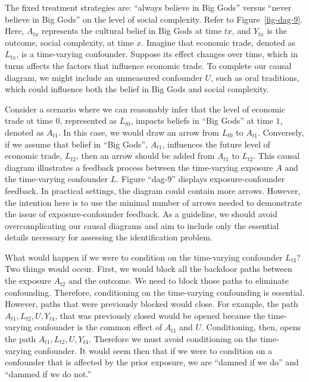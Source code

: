 \documentclass[
  singlecolumn]{article}
\begin{document}
The fixed treatment strategies are: ``always believe in Big Gods''
versus ``never believe in Big Gods'' on the level of social complexity.
Refer to Figure~\ref{fig-dag-9}. Here, \(A_{tx}\) represents the
cultural belief in Big Gods at time \(tx\), and \(Y_{tx}\) is the
outcome, social complexity, at time \(x\). Imagine that economic trade,
denoted as \(L_{tx}\), is a time-varying confounder. Suppose its effect
changes over time, which in turns affects the factors that influence
economic trade. To complete our causal diagram, we might include an
unmeasured confounder \(U\), such as oral traditions, which could
influence both the belief in Big Gods and social complexity.

Consider a scenario where we can reasonably infer that the level of
economic trade at time \(0\), represented as \(L_{t0}\), impacts beliefs
in ``Big Gods'' at time \(1\), denoted as \(A_{t1}\). In this case, we
would draw an arrow from \(L_{t0}\) to \(A_{t1}\). Conversely, if we
assume that belief in ``Big Gods'', \(A_{t1}\), influences the future
level of economic trade, \(L_{t2}\), then an arrow should be added from
\(A_{t1}\) to \(L_{t2}\). This causal diagram illustrates a feedback
process between the time-varying exposure \(A\) and the time-varying
confounder \(L\). Figure ``dag-9'' displays exposure-confounder
feedback. In practical settings, the diagram could contain more arrows.
However, the intention here is to use the minimal number of arrows
needed to demonstrate the issue of exposure-confounder feedback. As a
guideline, we should avoid overcomplicating our causal diagrams and aim
to include only the essential details necessary for assessing the
identification problem.

What would happen if we were to condition on the time-varying confounder
\(L_{t3}\)? Two things would occur. First, we would block all the
backdoor paths between the exposure \(A_{t2}\) and the outcome. We need
to block those paths to eliminate confounding. Therefore, conditioning
on the time-varying confounding is essential. However, paths that were
previously blocked would close. For example, the path
\(A_{t1}, L_{t2}, U, Y_{t4}\), that was previously closed would be
opened because the time-varying confounder is the common effect of
\(A_{t1}\) and \(U\). Conditioning, then, opens the path
\(A_{t1}, L_{t2}, U, Y_{t4}\). Therefore we must avoid conditioning on
the time-varying confounder. It would seem then that if we were to
condition on a confounder that is affected by the prior exposure, we are
``damned if we do'' and ``dammed if we do not.''
\end{document}
